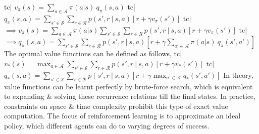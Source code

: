 tc| \( v_\pi(s) = \sum_{a \in \mathcal{A}} \pi(a|s) \ q_\pi(s, a) \)
tc| \( q_\pi(s, a) = \sum_{s' \in \mathcal{S}} \sum_{r \in \mathcal{R}} p(s', r \ | \ s, a) [r + \gamma v_\pi(s')] \)
tc| \( \implies v_\pi(s) = \sum_{a \in \mathcal{A}} \pi(a | s) \sum_{s' \in \mathcal{S}} \sum_{r \in R} p(s', r \ | \ s, a) [r + \gamma v_\pi(s')] \)
tc| \( \implies q_\pi(s, a) = \sum_{s' \in \mathcal{S}} \sum_{r \in \mathcal{R}} p(s', r \ | \ s, a) [r + \gamma\sum_{a' \in \mathcal{A}} \pi(a|s) \ q_\pi(s', a')] \)
The optimal value functions can be defined as follows,
tc| \( v_*(s) = \max_{a \in \mathcal{A}} \sum_{s' \in \mathcal{S}} \sum_{r \in \mathcal{R}} p(s', r \ | \ s, a) [r + \gamma v_*(s')] \)
tc| \( q_*(s, a) = \sum_{s' \in \mathcal{S}} \sum_{r \in \mathcal{R}} p(s', r \ | \ s, a) [r + \gamma \max_{a' \in \mathcal{A}} q_*(s', a')] \)
In theory, value functions can be learnt perfectly by brute-force search, which is equivalent to expanding & solving these recurrence relations till the final states. In practice, constraints on space & time complexity prohibit this type of exact value computation. The focus of reinforcement learning is to approximate an ideal policy, which different agents can do to varying degrees of success.
